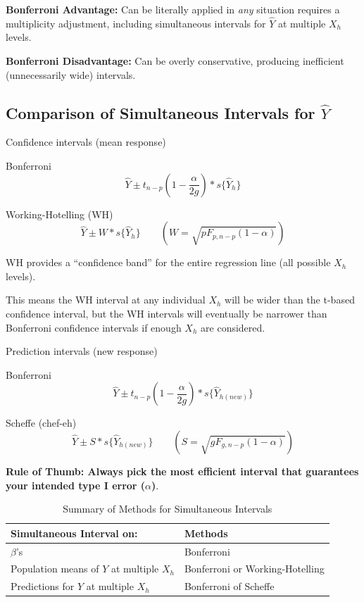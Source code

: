 \documentclass[12pt]{notes}
\begin{document}
\nspace
\bi
\item \textbf{Bonferroni Advantage:} Can be literally applied in \textit{any} situation requires a multiplicity adjustment, including simultaneous intervals for $\hat{Y}$ at multiple $X_h$ levels. 
\item \textbf{Bonferroni Disadvantage:} Can be overly conservative, producing inefficient (unnecessarily wide) intervals. 
\ei

\subsection*{Comparison of Simultaneous Intervals for $\hat{Y}$}
\bi
\item Confidence intervals (mean response)
\bi
\item Bonferroni
\[
\hat{Y} \pm t_{n-p}(1-\frac{\alpha}{2g})*s\{\hat{Y}_h\}
\]
\item Working-Hotelling (WH)
\[
\hat{Y} \pm W*s\{\hat{Y}_h\} \qquad \left(W = \sqrt{pF_{p, n-p}(1-\alpha)}\right)
\]

\begin{minipage}[l][2cm][c]{\textwidth}

\end{minipage}

\bi
\item WH provides a ``confidence band'' for the entire regression line (all possible $X_h$ levels). 
\item This means the WH interval at any individual $X_h$ will be wider than the t-based confidence interval, but the WH intervals will eventually be narrower than Bonferroni confidence intervals if enough $X_h$ are considered. 
\ei
\ei

\item Prediction intervals (new response)

\bi
\item Bonferroni
\[
\hat{Y} \pm t_{n-p}(1-\frac{\alpha}{2g})*s\{\hat{Y}_{h (new)}\}
\]
\item Scheffe (chef-eh)
\[
\hat{Y} \pm S*s\{\hat{Y}_{h (new)}\} \qquad \left(S = \sqrt{gF_{g, n-p}(1-\alpha)}\right)
\]
\ei
\ei

\textbf{Rule of Thumb: Always pick the most efficient interval that guarantees your intended type I error ($\alpha$)}. 

\nspace

\begin{table}[H]
\centering
\caption{Summary of Methods for Simultaneous Intervals}
\begin{tabular}{|l|l|}
\hline
\textbf{Simultaneous Interval on:} & \textbf{Methods} \\ \hline
$\beta$'s & Bonferroni \\ \hline
Population means of $Y$ at multiple $X_h$ & Bonferroni or Working-Hotelling \\ \hline
Predictions for $Y$ at multiple $X_h$ & Bonferroni of Scheffe \\ \hline
\end{tabular}
\end{table}
\end{document}
